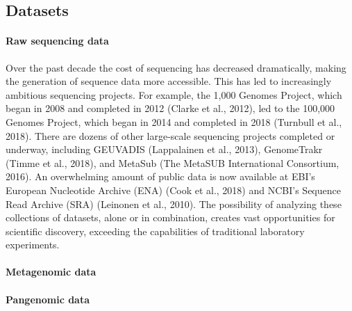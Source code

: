 \subsection{Datasets}


\paragraph{Raw sequencing data}
Over the past decade the cost of sequencing has decreased dramatically, making the generation of sequence data more accessible. This has led to increasingly ambitious sequencing projects. For example, the 1,000 Genomes Project, which began in
2008 and completed in 2012 (Clarke et al., 2012), led to the 100,000 Genomes Project, which began in 2014 and completed
in 2018 (Turnbull et al., 2018). There are dozens of other large-scale sequencing projects completed or underway, including
GEUVADIS (Lappalainen et al., 2013), GenomeTrakr (Timme et al., 2018), and MetaSub (The MetaSUB International Consortium, 2016). An overwhelming amount of public data is now available at EBI’s European Nucleotide Archive (ENA) (Cook
et al., 2018) and NCBI’s Sequence Read Archive (SRA) (Leinonen et al., 2010). The possibility of analyzing these collections
of datasets, alone or in combination, creates vast opportunities for scientific discovery, exceeding the capabilities of traditional
laboratory experiments.



\paragraph{Metagenomic data}

\paragraph{Pangenomic data}

